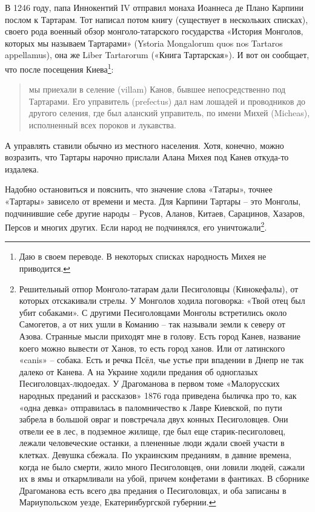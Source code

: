 В 1246 году, папа Иннокентий IV отправил монаха Иоаннеса де Плано Карпини послом к Тартарам. Тот написал потом книгу (существует в нескольких списках), своего рода военный обзор монголо-татарского государства «История Монголов, которых мы называем Тартарами» (Ystoria Mongalorum quos nos Tartaros appellamus), она же Liber Tartarorum («Книга Тартарская»)\cite{karpini}. И вот он сообщает, что после посещения Киева\footnote{Даю в своем переводе. В некоторых списках народность Михея не приводится.}:

\begin{quotation}
мы приехали в селение (villam) Канов, бывшее непосредственно под Тартарами. Его управитель (pref\-ectus) дал нам лошадей и проводников до другого селения, где был аланский управитель, по имени Михей (Micheas), исполненный всех пороков и лукавства.
\end{quotation}

А управлять ставили обычно из местного населения. Хотя, конечно, можно возразить, что Тартары нарочно прислали Алана Михея под Канев откуда-то издалека.

Надобно остановиться и пояснить, что значение слова «Татары», точнее «Тартары» зависело от времени и места. Для Карпини Тартары – это Монголы, подчинившие себе другие народы – Русов, Аланов, Китаев, Сарацинов, Хазаров, Персов и многих других. Если народ не подчинялся, его уничтожали\footnote{Решительный отпор Монголо-татарам дали Песиголовцы (Кинокефалы), от которых отскакивали стрелы. У Монголов ходила поговорка: «Твой отец был убит собаками». С другими Песиголовцами Монголы встретились около Самогетов, а от них ушли в Команию – так называли земли к северу от Азова. Странные мысли приходят мне в голову. Есть город Канев, название коего можно вывести от Ханов, то есть город ханов. Или от латинского «canis» – собака. Есть и речка Псёл, чье устье при впадении в Днепр не так далеко от Канева. А на Украине ходили предания об одноглазых Песиголовцах-людоедах. У Драгоманова в первом томе «Малорусских народных преданий и рассказов» 1876 года приведена быличка про то, как «одна девка» отправилась в паломничество к Лавре Киевской, по пути забрела в большой овраг и повстречала двух конных Песиголовцев. Они отвели ее в лес, в подземное жилище, где был еще старик-песиголовец, лежали человеческие останки, а плененные люди ждали своей участи в клетках. Девушка сбежала. По украинским преданиям, в давние времена, когда не было смерти, жило много Песиголовцев, они ловили людей, сажали их в ямы и откармливали на убой, причем конфетами в фантиках. В сборнике Драгоманова есть всего два предания о Песиголовцах, и оба записаны в Мариупольском уезде, Екатеринбургской губернии.}. 

